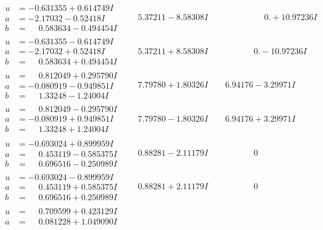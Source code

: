 \documentclass[1p]{elsarticle_modified}
\theoremstyle{definition}
\begin{document}
$$\begin{array}{c|c|c}
\begin{aligned}
u &= -0.631355 + 0.614749 I \\
a &= -2.17032 - 0.52418 I \\
b &= \phantom{-}0.583634 - 0.494454 I\end{aligned}
 & \phantom{-}5.37211 - 8.58308 I & \phantom{-0.000000 -}0. + 10.97236 I \\ \hline\begin{aligned}
u &= -0.631355 - 0.614749 I \\
a &= -2.17032 + 0.52418 I \\
b &= \phantom{-}0.583634 + 0.494454 I\end{aligned}
 & \phantom{-}5.37211 + 8.58308 I & \phantom{-0.000000 } 0. - 10.97236 I \\ \hline\begin{aligned}
u &= \phantom{-}0.812049 + 0.295790 I \\
a &= -0.080919 - 0.949851 I \\
b &= \phantom{-}1.33248 - 1.24004 I\end{aligned}
 & \phantom{-}7.79780 + 1.80326 I & \phantom{-}6.94176 - 3.29971 I \\ \hline\begin{aligned}
u &= \phantom{-}0.812049 - 0.295790 I \\
a &= -0.080919 + 0.949851 I \\
b &= \phantom{-}1.33248 + 1.24004 I\end{aligned}
 & \phantom{-}7.79780 - 1.80326 I & \phantom{-}6.94176 + 3.29971 I \\ \hline\begin{aligned}
u &= -0.693024 + 0.899959 I \\
a &= \phantom{-}0.453119 - 0.585375 I \\
b &= \phantom{-}0.696516 - 0.250989 I\end{aligned}
 & \phantom{-}0.88281 - 2.11179 I & \phantom{-0.000000 } 0 \\ \hline\begin{aligned}
u &= -0.693024 - 0.899959 I \\
a &= \phantom{-}0.453119 + 0.585375 I \\
b &= \phantom{-}0.696516 + 0.250989 I\end{aligned}
 & \phantom{-}0.88281 + 2.11179 I & \phantom{-0.000000 } 0 \\ \hline\begin{aligned}
u &= \phantom{-}0.709599 + 0.423129 I \\
a &= \phantom{-}0.081228 + 1.049090 I \\

\end{aligned}
\end{array}$$
\end{document}
